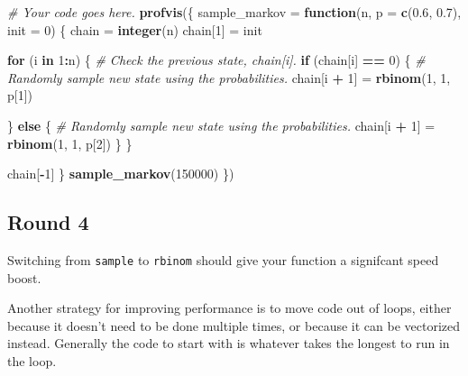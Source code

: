\documentclass[
]{article}
\newenvironment{Shaded}{\begin{snugshade}}{\end{snugshade}}
\newcommand{\CommentTok}[1]{\textcolor[rgb]{0.56,0.35,0.01}{\textit{#1}}}
\newcommand{\ControlFlowTok}[1]{\textcolor[rgb]{0.13,0.29,0.53}{\textbf{#1}}}
\newcommand{\DataTypeTok}[1]{\textcolor[rgb]{0.13,0.29,0.53}{#1}}
\newcommand{\DecValTok}[1]{\textcolor[rgb]{0.00,0.00,0.81}{#1}}
\newcommand{\FloatTok}[1]{\textcolor[rgb]{0.00,0.00,0.81}{#1}}
\newcommand{\KeywordTok}[1]{\textcolor[rgb]{0.13,0.29,0.53}{\textbf{#1}}}
\newcommand{\NormalTok}[1]{#1}
\newcommand{\OperatorTok}[1]{\textcolor[rgb]{0.81,0.36,0.00}{\textbf{#1}}}
\newcommand{\StringTok}[1]{\textcolor[rgb]{0.31,0.60,0.02}{#1}}
\begin{document}
\begin{Shaded}
\begin{Highlighting}[]
\CommentTok{\# Your code goes here.}
\KeywordTok{profvis}\NormalTok{(\{}
\NormalTok{  sample\_markov =}\StringTok{ }\ControlFlowTok{function}\NormalTok{(n, }\DataTypeTok{p =} \KeywordTok{c}\NormalTok{(}\FloatTok{0.6}\NormalTok{, }\FloatTok{0.7}\NormalTok{), }\DataTypeTok{init =} \DecValTok{0}\NormalTok{) \{}
\NormalTok{  chain =}\StringTok{ }\KeywordTok{integer}\NormalTok{(n)}
\NormalTok{  chain[}\DecValTok{1}\NormalTok{] =}\StringTok{ }\NormalTok{init}

  \ControlFlowTok{for}\NormalTok{ (i }\ControlFlowTok{in} \DecValTok{1}\OperatorTok{:}\NormalTok{n) \{}
    \CommentTok{\# Check the previous state, chain[i].}
    \ControlFlowTok{if}\NormalTok{ (chain[i] }\OperatorTok{==}\StringTok{ }\DecValTok{0}\NormalTok{) \{}
      \CommentTok{\# Randomly sample new state using the probabilities.}
\NormalTok{      chain[i }\OperatorTok{+}\StringTok{ }\DecValTok{1}\NormalTok{] =}\StringTok{ }\KeywordTok{rbinom}\NormalTok{(}\DecValTok{1}\NormalTok{, }\DecValTok{1}\NormalTok{, p[}\DecValTok{1}\NormalTok{])}

\NormalTok{    \} }\ControlFlowTok{else}\NormalTok{ \{}
      \CommentTok{\# Randomly sample new state using the probabilities.}
\NormalTok{      chain[i }\OperatorTok{+}\StringTok{ }\DecValTok{1}\NormalTok{] =}\StringTok{ }\KeywordTok{rbinom}\NormalTok{(}\DecValTok{1}\NormalTok{, }\DecValTok{1}\NormalTok{, p[}\DecValTok{2}\NormalTok{])}
\NormalTok{    \}}
\NormalTok{  \}}

\NormalTok{  chain[}\OperatorTok{{-}}\DecValTok{1}\NormalTok{]}
\NormalTok{\}}
  \KeywordTok{sample\_markov}\NormalTok{(}\DecValTok{150000}\NormalTok{)}
\NormalTok{\})}
\end{Highlighting}
\end{Shaded}

\hypertarget{round-4}{%
\subsection{Round 4}\label{round-4}}

Switching from \texttt{sample} to \texttt{rbinom} should give your
function a signifcant speed boost.

Another strategy for improving performance is to move code out of loops,
either because it doesn't need to be done multiple times, or because it
can be vectorized instead. Generally the code to start with is whatever
takes the longest to run in the loop.
\end{document}
